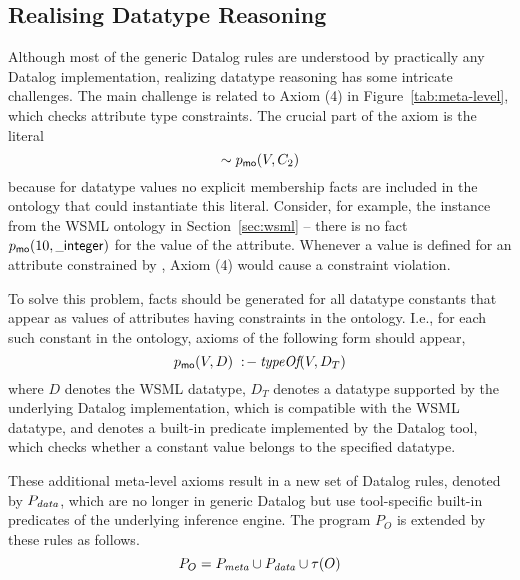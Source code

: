 \def\dataaxioms{\ensuremath{P_{\smtxtit{data}}}\xspace}
\def\transdpred{\transtxt{dpred}}

\subsection{Realising Datatype Reasoning}
\label{sec:datatype_reasoning} Although most of the generic
Datalog rules are understood by practically any Datalog
implementation, realizing datatype reasoning has some intricate
challenges. The main challenge is related to Axiom (4) in
Figure~\ref{tab:meta-level}, which checks attribute type
constraints. The crucial part of the axiom is the literal
\[\sim p_{\mathrm{\sf mo}}(V,C_2)\] because for datatype values no explicit
membership facts are included in the ontology that could
instantiate this literal. Consider, for example, the instance
 from the WSML ontology in
Section~\ref{sec:wsml} -- there is no fact
$\pmo(10,\wsmlname{\_integer})$ for the value of the
 attribute. Whenever a value is
defined for an attribute constrained by , Axiom (4)
would cause a constraint violation.

To solve this problem, \pmo facts should be generated for all
datatype constants that appear as values of attributes having
 constraints in the ontology. I.e., for each such
constant in the ontology, axioms of the following form should
appear, \compress
\begin{displaymath}
    \pmo(V,D) \lprl \typeof(V, D_T) \compress
\end{displaymath}
where $D$ denotes the WSML datatype, $D_T$ denotes a datatype
supported by the underlying Datalog implementation, which is
compatible with the WSML datatype, and \typeof denotes a built-in
predicate implemented by the Datalog tool, which checks whether a
constant value belongs to the specified datatype.

These additional meta-level axioms result in a new set of Datalog
rules, denoted by \dataaxioms, which are no longer in generic
Datalog but use tool-specific built-in predicates of the
underlying inference engine. The program $P_O$ is extended by
these rules as follows. %
\begin{displaymath}
    P_O = \mlaxioms \cup \dataaxioms \cup \tau(O)
\end{displaymath}

